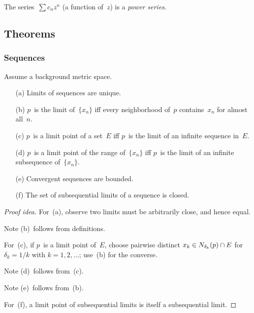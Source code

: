 \begin{defn}
The series~\(\sum c_nz^n\) (a function of~\(z\)) is a \emph{power series}.
\end{defn}

\subsection*{Theorems}
\subsubsection*{Sequences}
\begin{thm}
Assume a background metric space.
\begin{enumerate}[itemsep=0pt]
\item[(a)] Limits of sequences are unique.
\item[(b)] \(p\)~is the limit of~\(\{x_n\}\) iff every neighborhood of~\(p\) contains~\(x_n\) for almost all~\(n\).
\item[(c)] \(p\)~is a limit point of a set~\(E\) iff \(p\)~is the limit of an infinite sequence in~\(E\).
\item[(d)] \(p\)~is a limit point of the range of~\(\{x_n\}\) iff \(p\)~is the limit of an infinite subsequence of~\(\{x_n\}\).
\item[(e)] Convergent sequences are bounded.
\item[(f)] The set of subsequential limits of a sequence is closed.
\end{enumerate}
\end{thm}
\begin{proof}[Proof idea]
For~(a), observe two limits must be arbitrarily close, and hence equal.

Note (b)~follows from definitions.

For~(c), if \(p\)~is a limit point of~\(E\), choose pairwise distinct \(x_k\in N_{\delta_k}(p)\cap E\) for \(\delta_k=1/k\) with \(k=1,2,\ldots\); use~(b) for the converse.

Note (d)~follows from~(c).

Note (e)~follows from~(b).

For~(f), a limit point of subsequential limits is itself a subsequential limit.
\end{proof}

